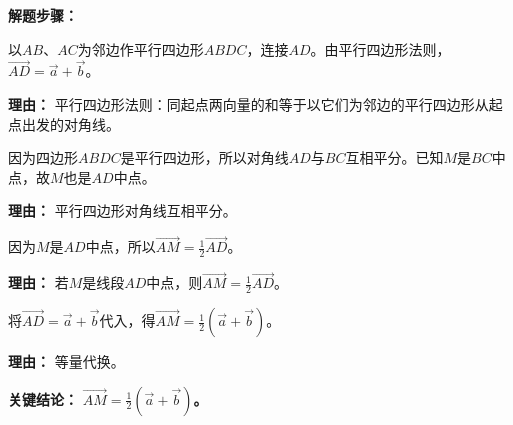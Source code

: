 \begin{examplebox}
	\textbf{\textcolor{CExample}{解题步骤：}}
	\begin{description}[style=nextline, leftmargin=2.8em, labelsep=0.5em, itemsep=0.45em]
		\item[\textbf{第一步（构造平行四边形）：}] 以$AB$、$AC$为邻边作平行四边形$ABDC$，连接$AD$。由平行四边形法则，$\overrightarrow{AD}=\vec{a}+\vec{b}$。
			\par\textbf{理由：}
			平行四边形法则：同起点两向量的和等于以它们为邻边的平行四边形从起点出发的对角线。
		\item[\textbf{第二步（确定中点关系）：}] 因为四边形$ABDC$是平行四边形，所以对角线$AD$与$BC$互相平分。已知$M$是$BC$中点，故$M$也是$AD$中点。
			\par\textbf{理由：}
			平行四边形对角线互相平分。
		\item[\textbf{第三步（中点向量关系）：}] 因为$M$是$AD$中点，所以$\overrightarrow{AM}=\frac12\overrightarrow{AD}$。
			\par\textbf{理由：}
			若$M$是线段$AD$中点，则$\overrightarrow{AM}=\frac12\overrightarrow{AD}$。
		\item[\textbf{第四步（代入得结果）：}] 将$\overrightarrow{AD}=\vec{a}+\vec{b}$代入，得$\overrightarrow{AM}=\frac12(\vec{a}+\vec{b})$。
			\par\textbf{理由：}
			等量代换。
	\end{description}

	\textbf{\textcolor{CExample}{关键结论：}}
	\textbf{$\overrightarrow{AM}=\frac12(\vec{a}+\vec{b})$。}
\end{examplebox}
